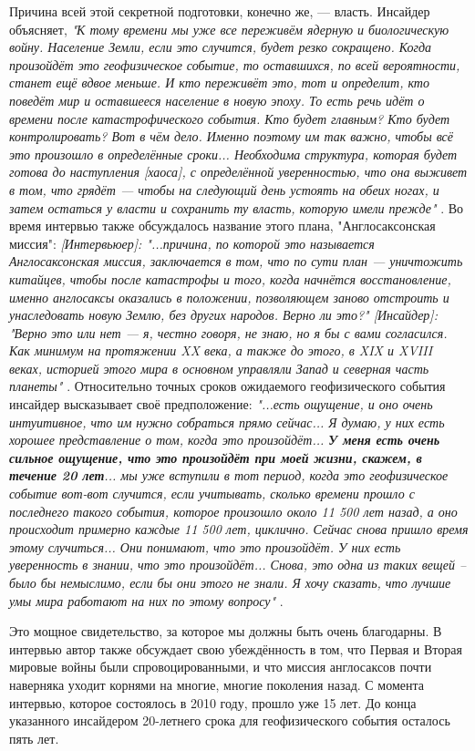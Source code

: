 \documentclass[10pt,twocolumn,letterpaper]{article}
\begin{document}
Причина всей этой секретной подготовки, конечно же, — власть. Инсайдер объясняет, \textit{"К тому времени мы уже все переживём ядерную и биологическую войну. Население Земли, если это случится, будет резко сокращено. Когда произойдёт это геофизическое событие, то оставшихся, по всей вероятности, станет ещё вдвое меньше. И кто переживёт это, тот и определит, кто поведёт мир и оставшееся население в новую эпоху. То есть речь идёт о времени после катастрофического события. Кто будет главным? Кто будет контролировать? Вот в чём дело. Именно поэтому им так важно, чтобы всё это произошло в определённые сроки... Необходима структура, которая будет готова до наступления [хаоса], с определённой уверенностью, что она выживет в том, что грядёт — чтобы на следующий день устоять на обеих ногах, и затем остаться у власти и сохранить ту власть, которую имели прежде"} \cite{4}. Во время интервью также обсуждалось название этого плана, "Англосаксонская миссия": \textit{[Интервьюер]: "...причина, по которой это называется Англосаксонская миссия, заключается в том, что по сути план — уничтожить китайцев, чтобы после катастрофы и того, когда начнётся восстановление, именно англосаксы оказались в положении, позволяющем заново отстроить и унаследовать новую Землю, без других народов. Верно ли это?" [Инсайдер]: "Верно это или нет — я, честно говоря, не знаю, но я бы с вами согласился. Как минимум на протяжении XX века, а также до этого, в XIX и XVIII веках, историей этого мира в основном управляли Запад и северная часть планеты"} \cite{4}.
Относительно точных сроков ожидаемого геофизического события инсайдер высказывает своё предположение: \textit{"...есть ощущение, и оно очень интуитивное, что им нужно собраться прямо сейчас... Я думаю, у них есть хорошее представление о том, когда это произойдёт... \textbf{У меня есть очень сильное ощущение, что это произойдёт при моей жизни, скажем, в течение 20 лет}... мы уже вступили в тот период, когда это геофизическое событие вот-вот случится, если учитывать, сколько времени прошло с последнего такого события, которое произошло около 11 500 лет назад, а оно происходит примерно каждые 11 500 лет, циклично. Сейчас снова пришло время этому случиться... Они понимают, что это произойдёт. У них есть уверенность в знании, что это произойдёт... Снова, это одна из таких вещей -- было бы немыслимо, если бы они этого не знали. Я хочу сказать, что лучшие умы мира работают на них по этому вопросу"} \cite{4}.

Это мощное свидетельство, за которое мы должны быть очень благодарны. В интервью автор также обсуждает свою убеждённость в том, что Первая и Вторая мировые войны были спровоцированными, и что миссия англосаксов почти наверняка уходит корнями на многие, многие поколения назад. С момента интервью, которое состоялось в 2010 году, прошло уже 15 лет. До конца указанного инсайдером 20-летнего срока для геофизического события осталось пять лет.
\end{document}

